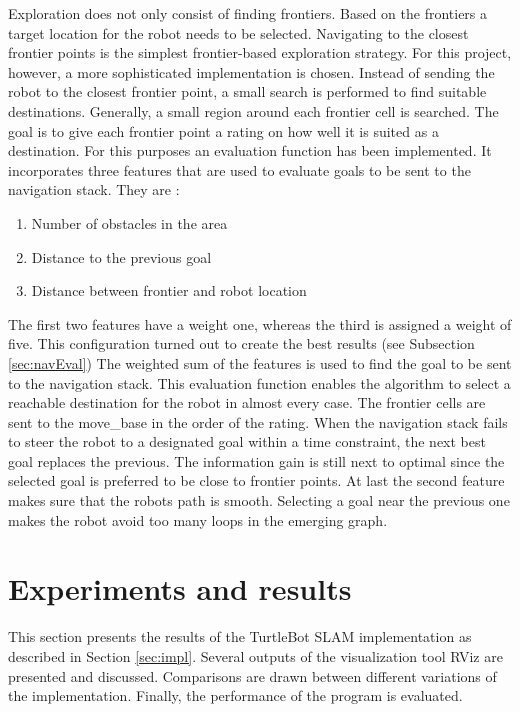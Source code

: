 \documentclass{ba-kecs}
\begin{document}
Exploration does not only consist of finding frontiers. Based on the frontiers a target location for the robot needs to be selected. Navigating to the closest frontier points is the simplest frontier-based exploration strategy. For this project, however, a more sophisticated implementation is chosen. Instead of sending the robot to the closest frontier point, a small search is performed to find suitable destinations. Generally, a small region around each frontier cell is searched. The goal is to give each frontier point a rating on how well it is suited as a destination. For this purposes an evaluation function has been implemented. It incorporates three features that are used to evaluate goals to be sent to the navigation stack. They are :
\begin{enumerate}
\item{Number of obstacles in the area}
\item{Distance to the previous goal}
\item{Distance between frontier and robot location}
\end{enumerate}
The first two features have a weight one, whereas the third is assigned a weight of five. This configuration turned out to create the best results (see Subsection \ref{sec:navEval}) The weighted sum of the features is used to find the goal to be sent to the navigation stack. This evaluation function enables the algorithm to select a reachable destination for the robot in almost every case. The frontier cells are sent to the move\_base in the order of the rating. When the navigation stack fails to steer the robot to a designated goal within a time constraint, the next best goal replaces the previous. The information gain is still next to optimal since the selected goal is preferred to be close to frontier points. At last the second feature makes sure that the robots path is smooth. Selecting a goal near the previous one makes the robot avoid too many loops in the emerging graph.

\section{Experiments and results}
\label{sec:exp}
This section presents the results of the TurtleBot SLAM implementation as described in Section \ref{sec:impl}. Several outputs of the visualization tool RViz are presented and discussed. Comparisons are drawn between different variations of the implementation. Finally, the performance of the program is evaluated.
\end{document}
